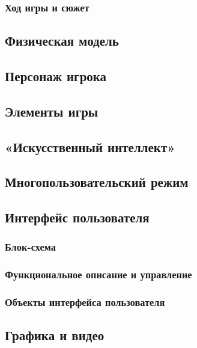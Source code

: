 \documentclass{article}
\begin{document}
	\subsubsection{Ход игры и сюжет}
	
	\subsection{Физическая модель}
	
	\subsection{Персонаж игрока}
	
	\subsection{Элементы игры}
	
	\subsection{«Искусственный интеллект»}
	
	\subsection{Многопользовательский режим}
	
	\subsection{Интерфейс пользователя}
	
	\subsubsection{Блок-схема}
	
	\subsubsection{Функциональное описание и управление}
	
	\subsubsection{Объекты интерфейса пользователя}
	
	\subsection{Графика и видео}
	
\end{document}
